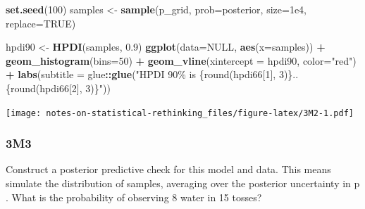 \documentclass[
]{book}
\newenvironment{Shaded}{\begin{snugshade}}{\end{snugshade}}
\newcommand{\DataTypeTok}[1]{\textcolor[rgb]{0.13,0.29,0.53}{#1}}
\newcommand{\DecValTok}[1]{\textcolor[rgb]{0.00,0.00,0.81}{#1}}
\newcommand{\FloatTok}[1]{\textcolor[rgb]{0.00,0.00,0.81}{#1}}
\newcommand{\KeywordTok}[1]{\textcolor[rgb]{0.13,0.29,0.53}{\textbf{#1}}}
\newcommand{\NormalTok}[1]{#1}
\newcommand{\OperatorTok}[1]{\textcolor[rgb]{0.81,0.36,0.00}{\textbf{#1}}}
\newcommand{\OtherTok}[1]{\textcolor[rgb]{0.56,0.35,0.01}{#1}}
\newcommand{\StringTok}[1]{\textcolor[rgb]{0.31,0.60,0.02}{#1}}
\begin{document}
\begin{Shaded}
\begin{Highlighting}[]
\KeywordTok{set.seed}\NormalTok{(}\DecValTok{100}\NormalTok{)}
\NormalTok{samples \textless{}{-}}\StringTok{ }\KeywordTok{sample}\NormalTok{(p\_grid, }\DataTypeTok{prob=}\NormalTok{posterior, }\DataTypeTok{size=}\FloatTok{1e4}\NormalTok{, }\DataTypeTok{replace=}\OtherTok{TRUE}\NormalTok{)}

\NormalTok{hpdi90 \textless{}{-}}\StringTok{ }\KeywordTok{HPDI}\NormalTok{(samples, }\FloatTok{0.9}\NormalTok{)}
\KeywordTok{ggplot}\NormalTok{(}\DataTypeTok{data=}\OtherTok{NULL}\NormalTok{, }\KeywordTok{aes}\NormalTok{(}\DataTypeTok{x=}\NormalTok{samples)) }\OperatorTok{+}\StringTok{ }
\StringTok{  }\KeywordTok{geom\_histogram}\NormalTok{(}\DataTypeTok{bins=}\DecValTok{50}\NormalTok{) }\OperatorTok{+}\StringTok{ }
\StringTok{  }\KeywordTok{geom\_vline}\NormalTok{(}\DataTypeTok{xintercept =}\NormalTok{ hpdi90, }\DataTypeTok{color=}\StringTok{"red"}\NormalTok{) }\OperatorTok{+}\StringTok{ }
\StringTok{  }\KeywordTok{labs}\NormalTok{(}\DataTypeTok{subtitle =}\NormalTok{ glue}\OperatorTok{::}\KeywordTok{glue}\NormalTok{(}\StringTok{"HPDI 90\% is \{round(hpdi66[1], 3)\}..\{round(hpdi66[2], 3)\}"}\NormalTok{))}
\end{Highlighting}
\end{Shaded}

\texttt{[image: notes-on-statistical-rethinking\_files/figure-latex/3M2-1.pdf]}

\hypertarget{m3-1}{%
\subsubsection*{3M3}\label{m3-1}}

Construct a posterior predictive check for this model and data. This means simulate the distribution of samples, averaging over the posterior uncertainty in p . What is the probability of observing 8 water in 15 tosses?
\end{document}
